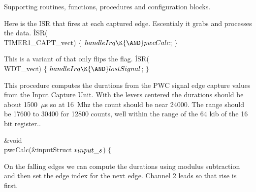Supporting routines, functions, procedures and configuration
blocks.


\fi

Here is the ISR that fires at each captured edge.
Escentialy it grabs and processes the  data.
\Y\B\.{ISR}(\\{TIMER1\_CAPT\_vect})\7
${}\{{}$\1\7
${}\\{handleIrq}\K{\AND}\\{pwcCalc}{}$;\7
\4${}\}{}$\2\Y\par
\fi

This is a variant of  that only flips the 
flag.
\Y\B\.{ISR}(\\{WDT\_vect})\7
${}\{{}$\1\7
${}\\{handleIrq}\K{\AND}\\{lostSignal}{}$;\7
\4${}\}{}$\2\Y\par
\fi

This procedure computes the durations from the PWC signal edge capture values
from the Input Capture Unit.
With the levers centered the durations should be about 1500~$\mu$s so at
16~Mhz the count should be near 24000.
The range should be 17600 to 30400 for 12800 counts, well within the range
of the 64 kib of the 16 bit register..


\Y\B\&{void} \\{pwcCalc}(\&{inputStruct} ${}{*}\\{input\_s}{}$)\1\1\7
$\{{}$\Y\par
\fi

On the falling edges we can compute the durations using modulus subtraction
and then set the edge index for the next edge.
Channel 2 leads so that rise is first.

